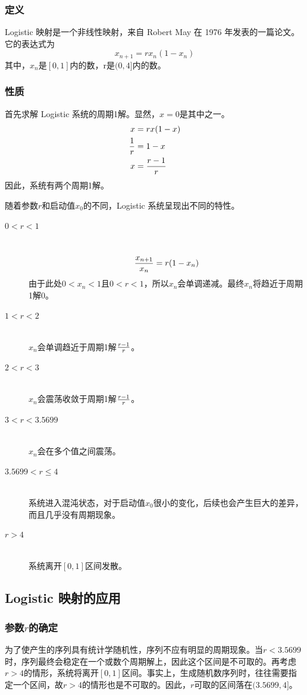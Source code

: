 \documentclass[UTF8]{ctexart}
\begin{document}
\subsubsection{定义}
Logistic 映射是一个非线性映射，来自 Robert May 在 1976 年发表的一篇论文\cite{logisticmap}。它的表达式为
\[
x_{n+1}=rx_n(1-x_n)
\]
其中，$x_n$是$[0, 1]$内的数，r是$(0, 4]$内的数。

\subsubsection{性质}
首先求解 Logistic 系统的周期1解。显然，$x=0$是其中之一。
\begin{align*} 
x&=rx(1-x)\\
{1\over r}&={1-x}\\
{x}&={{r-1}\over{r}}
\end{align*}
因此，系统有两个周期1解。

随着参数$r$和启动值$x_0$的不同，Logistic 系统呈现出不同的特性。
\begin{description}
  \item[$0<r<1$] \hfill \\
  \[
  {{x_{n+1}}\over{x_n}}={r(1-x_n)}
  \]
  由于此处$0 <x_n < 1$且$0<r<1$，所以$x_n$会单调递减。最终$x_n$将趋近于周期1解0。
  \item[$1<r<2$] \hfill \\
  $x_n$会单调趋近于周期1解${r-1}\over r$。
  \item[$2<r<3$] \hfill \\
  $x_n$会震荡收敛于周期1解${r-1}\over r$。
  \item[$3<r<3.5699$] \hfill \\
  $x_n$会在多个值之间震荡。
  \item[$3.5699<r\leq4$] \hfill \\
  系统进入混沌状态，对于启动值$x_0$很小的变化，后续也会产生巨大的差异，而且几乎没有周期现象。
  \item[$r>4$] \hfill \\
  系统离开$[0, 1]$区间发散。
\end{description}
\subsection{Logistic 映射的应用}
\subsubsection{参数$r$的确定}
为了使产生的序列具有统计学随机性，序列不应有明显的周期现象。当$r<3.5699$时，序列最终会稳定在一个或数个周期解上，因此这个区间是不可取的。再考虑$r>4$的情形，系统将离开$[0, 1]$区间。事实上，生成随机数序列时，往往需要指定一个区间，故$r>4$的情形也是不可取的。因此，$r$可取的区间落在$(3.5699, 4]$。
\end{document}
